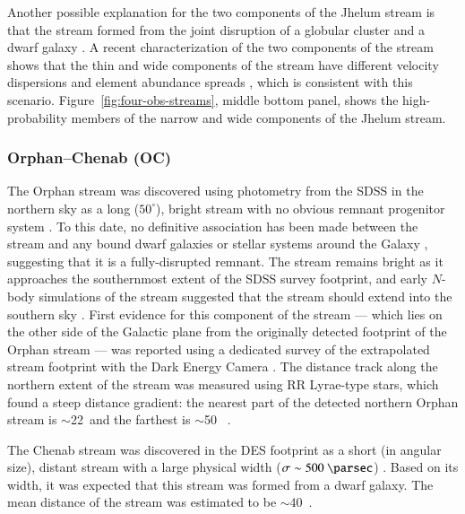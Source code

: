 \documentclass[final,5p,times,twocolumn,authoryear]{elsarticle}
\begin{document}
Another possible explanation for the two components of the Jhelum stream is that the
stream formed from the joint disruption of a globular cluster and a dwarf galaxy
\citep{bonaca:2019}.
A recent characterization of the two components of the stream shows that the thin and
wide components of the stream have different velocity dispersions and element abundance
spreads \citep{awad:2024}, which is consistent with this scenario.
Figure~\ref{fig:four-obs-streams}, middle bottom panel, shows the high-probability
members of the narrow and wide components of the Jhelum stream.




\subsubsection{Orphan--Chenab (OC)}
\label{sec:oc}

The Orphan stream was discovered using photometry from the SDSS in the northern sky as a
long ($50^\circ$), bright stream with no obvious remnant progenitor system
\citep{belokurov:2006, grillmair:2006-orphan, belokurov:2007}.
To this date, no definitive association has been made between the stream and any bound
dwarf galaxies or stellar systems around the Galaxy \citep{fellhauer:2007, newberg:2010,
casey:2013, casey:2014, grillmair:2015}, suggesting that it is a fully-disrupted
remnant.
The stream remains bright as it approaches the southernmost extent of the SDSS survey
footprint, and early $N$-body simulations of the stream suggested that the stream should
extend into the southern sky \citep[e.g.,][]{sales:2008}.
First evidence for this component of the stream --- which lies on the other side of the
Galactic plane from the originally detected footprint of the Orphan stream --- was
reported using a dedicated survey of the extrapolated stream footprint with the Dark
Energy Camera \citep{grillmair:2015}.
The distance track along the northern extent of the stream was measured using RR
Lyrae-type stars, which found a steep distance gradient: the nearest part of the
detected northern Orphan stream is $\sim$22~\kpc and the farthest is $\sim$50~\kpc
\citep{sesar:2013, hendel:2018}.

The Chenab stream was discovered in the DES footprint as a short (in angular size),
distant stream with a large physical width ($\sigma \sim 500~\unit{\parsec}$)
\citep{shipp:2018}. Based on its width, it was expected that this stream was formed from
a dwarf galaxy. The mean distance of the stream was estimated to be $\sim$40~\kpc.
\end{document}
